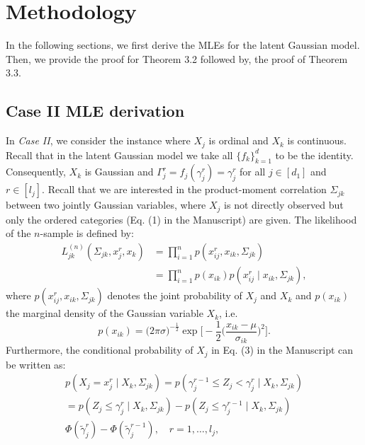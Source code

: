 
\section{Methodology}

In the following sections, we first derive the MLEs for the latent Gaussian model. Then, we provide the proof for Theorem 3.2 followed by, the proof of Theorem 3.3.

\subsection{Case II MLE derivation}

In \textit{Case II}, we consider the instance where $X_j$ is ordinal and $X_k$ is continuous. Recall that in the latent Gaussian model we take all \(\{f_k\}_{k=1}^d\) to be the identity. Consequently, \(X_k\) is Gaussian and \(\Gamma_j^r = f_j(\gamma_j^r) = \gamma_j^r\) for all \(j \in [d_1]\) and \(r \in [l_j]\). Recall that we are interested in the product-moment correlation $\Sigma_{jk}$ between two jointly Gaussian variables, where $X_j$ is not directly observed but only the ordered categories (Eq. (1) in the Manuscript) are given. The likelihood of the $n$-sample is defined by:
\begin{equation}\label{polyserial_likelihood_appendix}
    \begin{split}
        L_{jk}^{(n)}(\Sigma_{jk}, x_j^r,x_k) &= \prod_{i=1}^n p(x_{ij}^{r},x_{ik}, \Sigma_{jk}) \\
        &= \prod_{i=1}^n p(x_{ik})p(x_{ij}^{r} \mid x_{ik}, \Sigma_{jk}),
    \end{split}
\end{equation}
where $p(x_{ij}^{r},x_{ik}, \Sigma_{jk})$ denotes the joint probability of  $X_j$ and $X_k$ and $p(x_{ik})$ the marginal density of the Gaussian variable $X_k$, i.e.
\begin{equation*}\label{marginal_normal}
    p(x_{ik}) = \big(2\pi\sigma\big)^{-\frac{1}{2}} \exp\Bigg[-\frac{1}{2}\bigg(\frac{x_{ik} - \mu}{\sigma_{ik}}\bigg)^2\Bigg].
\end{equation*}
Furthermore, the conditional probability of $X_j$ in Eq. %
(3) in the Manuscript can be written as:
\begin{equation}\label{threshold_conditionalprob}
    \begin{split}
        p(X_j = x_j^r \mid X_k, \Sigma_{jk}) = p(\gamma_j^{r-1} \leq Z_j < \gamma_j^r \mid X_k, \Sigma_{jk}) \\
        = p(Z_j \leq \gamma_j^{r} \mid X_k, \Sigma_{jk}) - p(Z_j \leq \gamma_j^{r-1} \mid X_k, \Sigma_{jk}) \\
        \Phi(\tilde{\gamma}_j^{r}) - \Phi(\tilde{\gamma}_j^{r-1}), \quad r = 1, \dots, l_{j},
    \end{split}
\end{equation}
